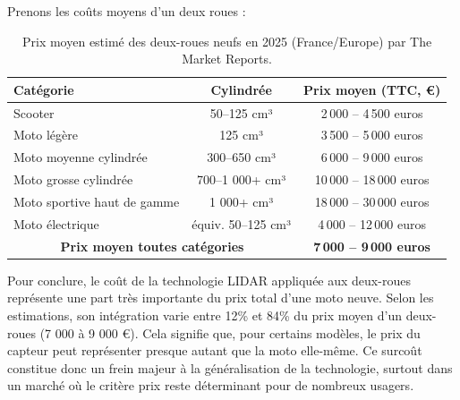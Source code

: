Prenons les coûts moyens d'un deux roues :\\
\begin{table}[ht]
\centering
\begin{tabular}{|l|c|c|}
\hline
\textbf{Catégorie} & \textbf{Cylindrée} & \textbf{Prix moyen (TTC, €)} \\
\hline
Scooter & 50--125 cm³ & 2\,000 -- 4\,500 euros \\
Moto légère & 125 cm³ & 3\,500 -- 5\,000 euros \\
Moto moyenne cylindrée & 300--650 cm³ & 6\,000 -- 9\,000 euros \\
Moto grosse cylindrée & 700--1 000+ cm³ & 10\,000 -- 18\,000 euros \\
Moto sportive haut de gamme & 1 000+ cm³ & 18\,000 -- 30\,000 euros \\
Moto électrique & équiv. 50--125 cm³ & 4\,000 -- 12\,000 euros \\
\hline
\multicolumn{2}{|c|}{\textbf{Prix moyen toutes catégories}} & \textbf{7\,000 -- 9\,000 euros} \\
\hline
\end{tabular}
\caption{Prix moyen estimé des deux-roues neufs en 2025 (France/Europe) par The Market Reports.}
\end{table}

Pour conclure, le coût de la technologie LIDAR appliquée aux deux-roues représente une part très importante du prix total d’une moto neuve. Selon les estimations, son intégration varie entre 12\% et 84\% du prix moyen d’un deux-roues (7 000 à 9 000 €). Cela signifie que, pour certains modèles, le prix du capteur peut représenter presque autant que la moto elle-même. Ce surcoût constitue donc un frein majeur à la généralisation de la technologie, surtout dans un marché où le critère prix reste déterminant pour de nombreux usagers.


